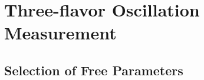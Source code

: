 \section{Three-flavor Oscillation Measurement}

\subsection{Selection of Free Parameters}
\label{sec:std-osc-free-parameters}